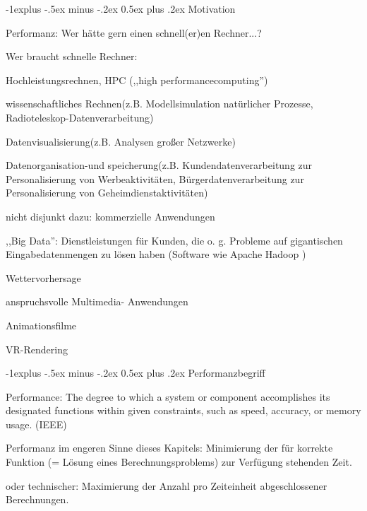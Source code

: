 \documentclass[a4paper]{article}
\makeatletter
\renewcommand{\subsection}{\@startsection{subsection}{2}{0mm}%
 {-1explus -.5ex minus -.2ex}%
 {0.5ex plus .2ex}%
 {\normalfont\normalsize\bfseries}}
\makeatother
\begin{document}
\begin{multicols}{3}
    \subsection{Motivation}

    \begin{itemize*}
        \item
        Performanz: Wer hätte gern einen schnell(er)en Rechner...?
        \item
        Wer braucht schnelle Rechner:
        \begin{itemize*}
            \item Hochleistungsrechnen, HPC (,,high performancecomputing'') \begin{itemize*} \item wissenschaftliches Rechnen(z.B. Modellsimulation natürlicher Prozesse, Radioteleskop-Datenverarbeitung) \item Datenvisualisierung(z.B. Analysen großer Netzwerke) \item Datenorganisation-und speicherung(z.B. Kundendatenverarbeitung zur Personalisierung von Werbeaktivitäten, Bürgerdatenverarbeitung zur Personalisierung von Geheimdienstaktivitäten) \end{itemize*}
            \item nicht disjunkt dazu: kommerzielle Anwendungen \begin{itemize*} \item ,,Big Data'': Dienstleistungen für Kunden, die o. g. Probleme auf gigantischen Eingabedatenmengen zu lösen haben (Software wie Apache Hadoop ) \item Wettervorhersage \end{itemize*}
            \item anspruchsvolle Multimedia- Anwendungen \begin{itemize*} \item Animationsfilme \item VR-Rendering \end{itemize*}
        \end{itemize*}
    \end{itemize*}


    \subsection{Performanzbegriff}

    \begin{itemize*}
        \item
        Performance: The degree to which a system or component accomplishes
        its designated functions within given constraints, such as speed,
        accuracy, or memory usage. (IEEE)
        \item
        Performanz im engeren Sinne dieses Kapitels: Minimierung der für
        korrekte Funktion (= Lösung eines Berechnungsproblems) zur Verfügung
        stehenden Zeit.
        \item
        oder technischer: Maximierung der Anzahl pro Zeiteinheit
        abgeschlossener Berechnungen.
    \end{itemize*}



\end{multicols}
\end{document}

